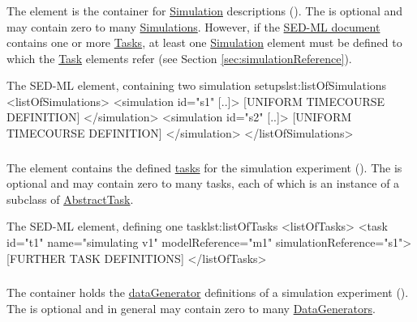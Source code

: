 \subsubsection{}
\label{sec:listOfSimulations}
The  element is the container for \hyperref[class:simulation]{Simulation} descriptions (). The  is optional and may contain zero to many \hyperref[class:simulation]{Simulations}. However, if the \hyperref[class:sed-ml]{SED-ML document} contains one or more \hyperref[class:abstractTask]{Tasks}, at least one \hyperref[class:simulation]{Simulation} element must be defined to which the \hyperref[class:abstractTask]{Task} elements refer (see Section \ref{sec:simulationReference}).

\begin{myXmlLst}{The SED-ML  element, containing two simulation setups}{lst:listOfSimulations}
<listOfSimulations>
	<simulation id="s1" [..]>
		[UNIFORM TIMECOURSE DEFINITION]
	</simulation>
	<simulation id="s2" [..]>
   		[UNIFORM TIMECOURSE DEFINITION]
	</simulation>
</listOfSimulations>
\end{myXmlLst}
 
\subsubsection{}
\label{sec:listOfTasks}
The  element contains the defined \hyperref[class:task]{tasks} for the simulation experiment (). The  is optional and may contain zero to many tasks, each of which is an instance of a subclass of \hyperref[class:abstractTask]{AbstractTask}.

\begin{myXmlLst}{The SED-ML  element, defining one task}{lst:listOfTasks}
<listOfTasks>
	<task id="t1" name="simulating v1" modelReference="m1" simulationReference="s1">
	[FURTHER TASK DEFINITIONS]
</listOfTasks>
\end{myXmlLst}


\subsubsection{}
\label{sec:listOfDataGenerators}
The  container holds the \hyperref[class:dataGenerator]{dataGenerator} definitions of a simulation experiment (). The  is optional and in general may contain zero to many \hyperref[class:dataGenerator]{DataGenerators}.

